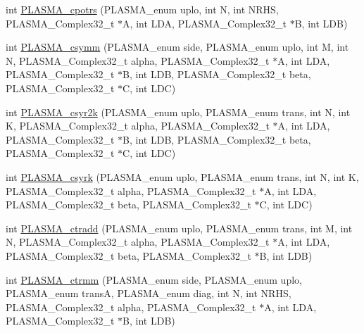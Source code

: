 \begin{DoxyCompactItemize}
int \hyperlink{group__PLASMA__Complex32__t_gaf429b7116507625912226d3c91bdfecc_gaf429b7116507625912226d3c91bdfecc}{P\+L\+A\+S\+M\+A\+\_\+cpotrs} (P\+L\+A\+S\+M\+A\+\_\+enum uplo, int N, int N\+R\+H\+S, P\+L\+A\+S\+M\+A\+\_\+\+Complex32\+\_\+t $\ast$A, int L\+D\+A, P\+L\+A\+S\+M\+A\+\_\+\+Complex32\+\_\+t $\ast$B, int L\+D\+B)
\item 
int \hyperlink{group__PLASMA__Complex32__t_gac62cd0bd5b290a074c3af371972266a4_gac62cd0bd5b290a074c3af371972266a4}{P\+L\+A\+S\+M\+A\+\_\+csymm} (P\+L\+A\+S\+M\+A\+\_\+enum side, P\+L\+A\+S\+M\+A\+\_\+enum uplo, int M, int N, P\+L\+A\+S\+M\+A\+\_\+\+Complex32\+\_\+t alpha, P\+L\+A\+S\+M\+A\+\_\+\+Complex32\+\_\+t $\ast$A, int L\+D\+A, P\+L\+A\+S\+M\+A\+\_\+\+Complex32\+\_\+t $\ast$B, int L\+D\+B, P\+L\+A\+S\+M\+A\+\_\+\+Complex32\+\_\+t beta, P\+L\+A\+S\+M\+A\+\_\+\+Complex32\+\_\+t $\ast$C, int L\+D\+C)
\item 
int \hyperlink{group__PLASMA__Complex32__t_ga5a48c1ff1b73920651249deb75b9d0b7_ga5a48c1ff1b73920651249deb75b9d0b7}{P\+L\+A\+S\+M\+A\+\_\+csyr2k} (P\+L\+A\+S\+M\+A\+\_\+enum uplo, P\+L\+A\+S\+M\+A\+\_\+enum trans, int N, int K, P\+L\+A\+S\+M\+A\+\_\+\+Complex32\+\_\+t alpha, P\+L\+A\+S\+M\+A\+\_\+\+Complex32\+\_\+t $\ast$A, int L\+D\+A, P\+L\+A\+S\+M\+A\+\_\+\+Complex32\+\_\+t $\ast$B, int L\+D\+B, P\+L\+A\+S\+M\+A\+\_\+\+Complex32\+\_\+t beta, P\+L\+A\+S\+M\+A\+\_\+\+Complex32\+\_\+t $\ast$C, int L\+D\+C)
\item 
int \hyperlink{group__PLASMA__Complex32__t_gad7bae1673afbf5b73da18c20f376cb89_gad7bae1673afbf5b73da18c20f376cb89}{P\+L\+A\+S\+M\+A\+\_\+csyrk} (P\+L\+A\+S\+M\+A\+\_\+enum uplo, P\+L\+A\+S\+M\+A\+\_\+enum trans, int N, int K, P\+L\+A\+S\+M\+A\+\_\+\+Complex32\+\_\+t alpha, P\+L\+A\+S\+M\+A\+\_\+\+Complex32\+\_\+t $\ast$A, int L\+D\+A, P\+L\+A\+S\+M\+A\+\_\+\+Complex32\+\_\+t beta, P\+L\+A\+S\+M\+A\+\_\+\+Complex32\+\_\+t $\ast$C, int L\+D\+C)
\item 
int \hyperlink{group__PLASMA__Complex32__t_ga87ddb07f67b802e8e1cd0fde868680d4_ga87ddb07f67b802e8e1cd0fde868680d4}{P\+L\+A\+S\+M\+A\+\_\+ctradd} (P\+L\+A\+S\+M\+A\+\_\+enum uplo, P\+L\+A\+S\+M\+A\+\_\+enum trans, int M, int N, P\+L\+A\+S\+M\+A\+\_\+\+Complex32\+\_\+t alpha, P\+L\+A\+S\+M\+A\+\_\+\+Complex32\+\_\+t $\ast$A, int L\+D\+A, P\+L\+A\+S\+M\+A\+\_\+\+Complex32\+\_\+t beta, P\+L\+A\+S\+M\+A\+\_\+\+Complex32\+\_\+t $\ast$B, int L\+D\+B)
\item 
int \hyperlink{group__PLASMA__Complex32__t_ga17234cfdde42bd11866b3435a9a8295a_ga17234cfdde42bd11866b3435a9a8295a}{P\+L\+A\+S\+M\+A\+\_\+ctrmm} (P\+L\+A\+S\+M\+A\+\_\+enum side, P\+L\+A\+S\+M\+A\+\_\+enum uplo, P\+L\+A\+S\+M\+A\+\_\+enum trans\+A, P\+L\+A\+S\+M\+A\+\_\+enum diag, int N, int N\+R\+H\+S, P\+L\+A\+S\+M\+A\+\_\+\+Complex32\+\_\+t alpha, P\+L\+A\+S\+M\+A\+\_\+\+Complex32\+\_\+t $\ast$A, int L\+D\+A, P\+L\+A\+S\+M\+A\+\_\+\+Complex32\+\_\+t $\ast$B, int L\+D\+B)

\end{DoxyCompactItemize}
